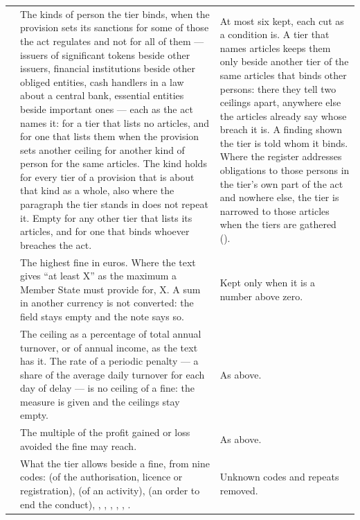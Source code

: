 \begin{xltabular}{\textwidth}{@{}L{27mm}YY@{}}
 & The kinds of person the tier binds, when the provision sets its sanctions for some of those the act regulates and not for all of them --- issuers of significant tokens beside other issuers, financial institutions beside other obliged entities, cash handlers in a law about a central bank, essential entities beside important ones --- each as the act names it: for a tier that lists no articles, and for one that lists them when the provision sets another ceiling for another kind of person for the same articles. The kind holds for every tier of a provision that is about that kind as a whole, also where the paragraph the tier stands in does not repeat it. Empty for any other tier that lists its articles, and for one that binds whoever breaches the act. & At most six kept, each cut as a condition is. A tier that names articles keeps them only beside another tier of the same articles that binds other persons: there they tell two ceilings apart, anywhere else the articles already say whose breach it is. A finding shown the tier is told whom it binds. Where the register addresses obligations to those persons in the tier's own part of the act and nowhere else, the tier is narrowed to those articles when the tiers are gathered (). \\
 & The highest fine in euros. Where the text gives \enquote{at least X} as the maximum a Member State must provide for, X. A sum in another currency is not converted: the field stays empty and the note says so. & Kept only when it is a number above zero. \\
 & The ceiling as a percentage of total annual turnover, or of annual income, as the text has it. The rate of a periodic penalty --- a share of the average daily turnover for each day of delay --- is no ceiling of a fine: the measure is given and the ceilings stay empty. & As above. \\
 & The multiple of the profit gained or loss avoided the fine may reach. & As above. \\
 & What the tier allows beside a fine, from nine codes:  (of the authorisation, licence or registration),  (of an activity),  (an order to end the conduct), , , , , , . & Unknown codes and repeats removed. \\
\end{xltabular}

